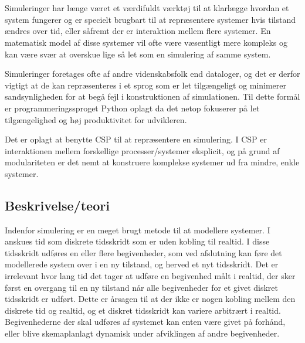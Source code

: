 \chapter{\Des}

Simuleringer har længe været et værdifuldt værktøj til at klarlægge hvordan et 
system fungerer og er specielt brugbart til at repræsentere systemer hvis 
tilstand ændres over tid, eller såfremt der er interaktion mellem flere systemer. En 
matematisk model af disse systemer vil ofte være væsentligt mere kompleks og 
kan være svær at overskue lige så let som en simulering af samme system. 

Simuleringer foretages ofte af andre videnskabsfolk end dataloger, og det er 
derfor vigtigt at de kan repræsenteres i et sprog som er let tilgængeligt og 
minimerer sandsynligheden for at begå fejl i konstruktionen af simulationen.  
Til dette formål er programmeringssproget Python oplagt da det netop fokuserer 
på let tilgængelighed og høj produktivitet for udvikleren. 

Det er oplagt at benytte CSP\cite{hoare-csp} til at repræsentere en simulering.  
I CSP er interaktionen mellem forskellige processer/systemer eksplicit, og på 
grund af modulariteten er det nemt at konstruere komplekse systemer ud fra 
mindre, enkle systemer. 

\section{Beskrivelse/teori} \label{sec:des-teori}


Indenfor simulering er \des en meget brugt metode til at modellere systemer. I 
\des anskues tid som diskrete tidsskridt som er uden kobling til realtid. I 
disse tidsskridt udføres en eller flere begivenheder, som ved afslutning kan 
føre det modellerede system over i en ny tilstand, og herved et nyt tidsskridt. 
Det er irrelevant hvor lang tid det tager at udføre en begivenhed målt i 
realtid, der sker først en overgang til en ny tilstand når alle begivenheder 
for et givet diskret tidsskridt er udført. Dette er årsagen til at der ikke er 
nogen kobling mellem den diskrete tid og realtid, og et diskret tidsskridt kan 
variere arbitrært i realtid. Begivenhederne der skal udføres af systemet kan 
enten være givet på forhånd, eller blive skemaplanlagt dynamisk under afviklingen 
af andre begivenheder. 

